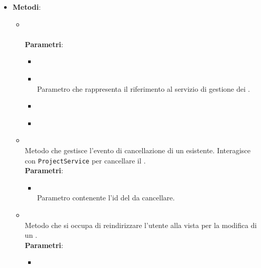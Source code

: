 \begin{itemize}
\begin{itemize}
\item {}
\\ \dpMDDialogServiceField
\item {}
\\ \dpScopeField
\end{itemize}
\item \textbf{Metodi}:
\begin{itemize}
\item {}
\\ \dpConstructor
\\ \textbf{Parametri}:
\begin{itemize}
\item {}
\\ \dpScopeParam
\item {}
\\ Parametro che rappresenta il riferimento al servizio di gestione dei .
\item {}
\\ \dpLocationParam
\item {}
\\ \dpMDDialogServiceParam
\end{itemize}
\item {}
\\ Metodo che gestisce l'evento di cancellazione di un  esistente. Interagisce con \texttt{ProjectService} per cancellare il .
\\ \textbf{Parametri}:
\begin{itemize}
\item {}
\\ Parametro contenente l'id del  da cancellare.
\end{itemize}
\item {}
\\ Metodo che si occupa di reindirizzare l'utente alla vista per la modifica di un .
\\ \textbf{Parametri}:
\begin{itemize}
\item {}

\end{itemize}
\end{itemize}
\end{itemize}
